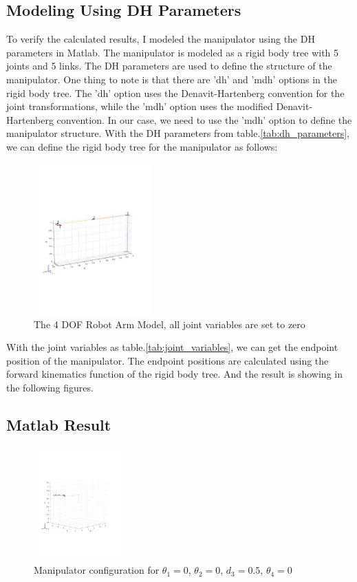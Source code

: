 \documentclass{article}
\begin{document}
\subsection*{Modeling Using DH Parameters}
To verify the calculated results, I modeled the manipulator using the DH parameters in Matlab. 
The manipulator is modeled as a rigid body tree with 5 joints and 5 links.
The DH parameters are used to define the structure of the manipulator.
One thing to note is that there are 'dh' and 'mdh' options in the rigid body tree.
The 'dh' option uses the Denavit-Hartenberg convention for the joint transformations, 
while the 'mdh' option uses the modified Denavit-Hartenberg convention.
In our case, we need to use the 'mdh' option to define the manipulator structure.
With the DH parameters from table.\ref{tab:dh_parameters}, we can define the rigid body tree for the manipulator as follows:
\begin{figure}[h]
  \centering
  \includegraphics[width=0.4\textwidth]{a_simple_3_dof_robot_arm.pdf}
  \caption{The 4 DOF Robot Arm Model, all joint variables are set to zero}
  \label{fig:simple_3_dof_robot_arm}
\end{figure}

With the joint variables as table.\ref{tab:joint_variables}, we can get the endpoint position of the manipulator.
The endpoint positions are calculated using the forward kinematics function of the rigid body tree.
And the result is showing in the following figures.
\subsection*{Matlab Result}

\begin{figure}[h!]
  \centering
  \includegraphics[width=0.3\textwidth]{configuration_1.pdf}
  \caption{Manipulator configuration for $\theta_1 = 0$, $\theta_2 = 0$, $d_3 = 0.5$, $\theta_4 = 0$}
  \label{fig:configuration_1}
\end{figure}
\end{document}
